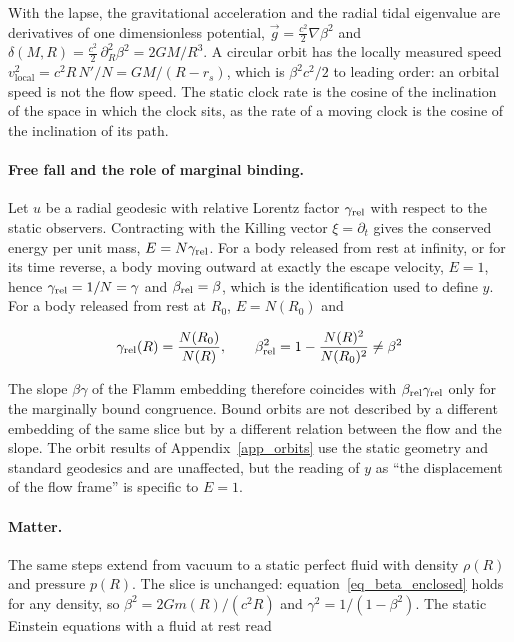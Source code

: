 \documentclass[anonymous]{iopjournal}
\begin{document}
With the lapse, the gravitational acceleration and the radial tidal eigenvalue are derivatives of one dimensionless potential, $\vec g=\tfrac{c^2}{2}\nabla\beta^2$ and $\delta(M,R)=\tfrac{c^2}{2}\,\partial_R^2\beta^2=2GM/R^3$. A circular orbit has the locally measured speed $v_{\mathrm{local}}^2=c^2R\,N'/N=GM/(R-r_s)$, which is $\beta^2c^2/2$ to leading order: an orbital speed is not the flow speed. The static clock rate is the cosine of the inclination of the space in which the clock sits, as the rate of a moving clock is the cosine of the inclination of its path.

\paragraph{Free fall and the role of marginal binding.}
Let $u$ be a radial geodesic with relative Lorentz factor $\gamma_{\rm rel}$ with respect to the static observers. Contracting with the Killing vector $\xi=\partial_t$ gives the conserved energy per unit mass, $E=N\gamma_{\rm rel}$. For a body released from rest at infinity, or for its time reverse, a body moving outward at exactly the escape velocity, $E=1$, hence $\gamma_{\rm rel}=1/N=\gamma$ and $\beta_{\rm rel}=\beta$, which is the identification used to define $y$. For a body released from rest at $R_0$, $E=N(R_0)$ and

\begin{equation}
    \gamma_{\rm rel}(R)=\frac{N(R_0)}{N(R)},
    \qquad
    \beta_{\rm rel}^2=1-\frac{N(R)^2}{N(R_0)^2}\neq\beta^2
\end{equation}

The slope $\beta\gamma$ of the Flamm embedding therefore coincides with $\beta_{\rm rel}\gamma_{\rm rel}$ only for the marginally bound congruence. Bound orbits are not described by a different embedding of the same slice but by a different relation between the flow and the slope. The orbit results of Appendix~\ref{app_orbits} use the static geometry and standard geodesics and are unaffected, but the reading of $y$ as ``the displacement of the flow frame'' is specific to $E=1$.

\paragraph{Matter.} The same steps extend from vacuum to a static perfect fluid with density $\rho(R)$ and pressure $p(R)$. The slice is unchanged: equation~\eqref{eq_beta_enclosed} holds for any density, so $\beta^2=2Gm(R)/(c^2R)$ and $\gamma^2=1/(1-\beta^2)$. The static Einstein equations with a fluid at rest read
\end{document}
